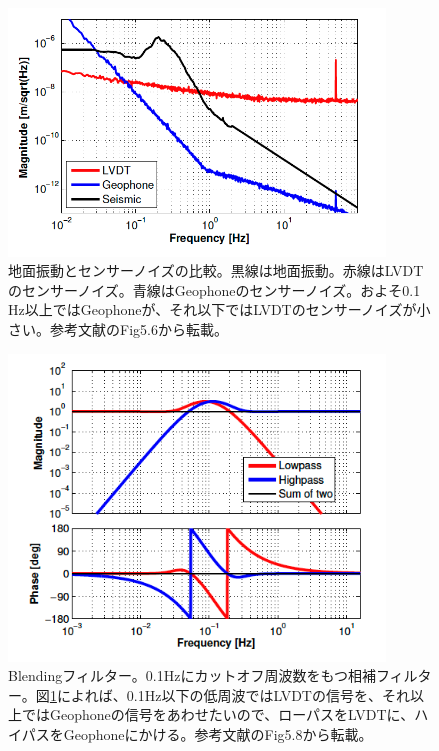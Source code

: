 \documentclass[a4paper,12pt]{jsarticle}
\begin{document}
\begin{figure}[H]
  \begin{center}
    \includegraphics[width=10.0cm]{./img_seismo_vs_lvdt.png}
  \end{center}
  \caption{地面振動とセンサーノイズの比較。黒線は地面振動。赤線はLVDTのセンサーノイズ。青線はGeophoneのセンサーノイズ。およそ0.1 Hz以上ではGeophoneが、それ以下ではLVDTのセンサーノイズが小さい。参考文献\cite{sekiguchiD2016}のFig5.6から転載。}
  \label{img:img_seismo_vs_lvdt}
\end{figure}


\begin{figure}[H]
  \begin{center}
    \includegraphics[width=10.0cm]{./img_pi_blending.png}
  \end{center}
  \caption{Blendingフィルター。0.1Hzにカットオフ周波数をもつ相補フィルター。図\ref{img:img_seismo_vs_lvdt}によれば、0.1Hz以下の低周波ではLVDTの信号を、それ以上ではGeophoneの信号をあわせたいので、ローパスをLVDTに、ハイパスをGeophoneにかける。参考文献\cite{sekiguchiD2016}のFig5.8から転載。}
  \label{img:img_pi_blending}
\end{figure}
\end{document}
